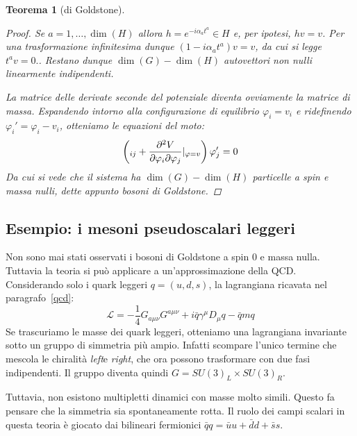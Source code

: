 \documentclass[italian,a4paper]{article}
\newtheorem*{theorem}{Teorema}
\theoremstyle{definition}
\newcommand{\lagr}{\ensuremath{\mathscr{L}}}
\newcommand{\Dimu}{\ensuremath{D_{\mu}}}
\begin{document}
\begin{theorem}[di Goldstone]
\begin{proof}
        Se $a = 1,\ldots, \dim(H)$ allora $h = e^{-i \alpha_a t^a} \in H$ e,
        per ipotesi, $hv = v$. Per una trasformazione infinitesima dunque
        $(1 - i\alpha_a t^a) v = v$, da cui si legge $t^a v = 0.$.
        Restano dunque $\dim(G) - \dim(H)$ autovettori non nulli linearmente
        indipendenti.

        La matrice delle derivate seconde del potenziale diventa ovviamente
        la matrice di massa. Espandendo intorno alla configurazione di
        equilibrio $\varphi_i = v_i$ e ridefinendo $\varphi_i' = \varphi_i -
        v_i$, otteniamo le equazioni del moto:
        \begin{equation*}
            \left( \box \delta_{ij} + \dfrac{\partial^2 V}{\partial
            \varphi_i \partial \varphi_j}|_{\varphi = v} \right) \varphi'_j
            = 0
        \end{equation*}
        Da cui si vede che il sistema ha $\dim(G) - \dim(H)$ particelle a
        spin e massa nulli, dette appunto bosoni di Goldstone.
    \end{proof}
\end{theorem}
\subsection*{Esempio: i mesoni pseudoscalari leggeri}
Non sono mai stati osservati i bosoni di Goldstone a spin $0$ e massa nulla.
Tuttavia la teoria si pu\`o applicare a un'approssimazione della QCD.
Considerando solo i quark leggeri $q = (u, d, s)$, la lagrangiana ricavata nel paragrafo~\ref{qcd}:
    \begin{equation*}
        \lagr = - \dfrac{1}{4}G_{a\mu\nu}G^{a\mu\nu} + i \bar q
        \gamma^\mu\Dimu q - \bar q m q
    \end{equation*}
Se trascuriamo le masse dei quark leggeri, otteniamo una lagrangiana
invariante sotto un gruppo di simmetria pi\`u ampio. Infatti scompare
l'unico termine che mescola le chiralit\`a \emph{left}e \emph{right}, che
ora possono trasformare con due fasi indipendenti. Il gruppo diventa quindi
$G = SU(3)_L \times SU(3)_R$.

Tuttavia, non esistono multipletti dinamici con masse molto simili. Questo
fa pensare che la simmetria sia spontaneamente rotta. Il ruolo dei campi
scalari in questa teoria \`e giocato dai bilineari fermionici $\bar q q = \bar u u +
\bar d d + \bar s s$.
\end{document}
